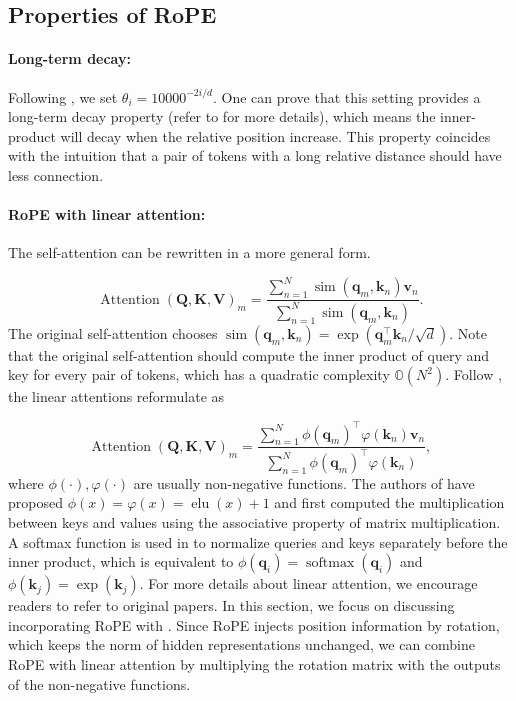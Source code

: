 \documentclass{article}
\def\q{{\boldsymbol q}}
\def\k{{\boldsymbol k}}
\def\v{{\boldsymbol v}}
\def\Q{{\boldsymbol Q}}
\def\K{{\boldsymbol K}}
\def\V{{\boldsymbol V}}
\begin{document}
\subsection{Properties of RoPE}
\label{sec: prop of RoPE}
\paragraph{Long-term decay:} 
Following \cite{Vaswani:2017}, we set $\theta_i=10000^{-2i/d}$. One can prove that this setting provides a long-term decay property (refer to  for more details), which means the inner-product will decay when the relative position increase. This property coincides with the intuition that a pair of tokens with a long relative distance should have less connection.

\paragraph{RoPE with linear attention:}
The self-attention can be rewritten in a more general form.

\begin{equation}
	\operatorname{Attention}(\mathbf{Q},\mathbf{K},\mathbf{V})_m=\frac{\sum_{n=1}^{N}\operatorname{sim}(\q_m,\k_n)\v_n}{\sum_{n=1}^{N}\operatorname{sim}(\q_m, \k_n)}.
	\label{fn:atten-full}
\end{equation}
The original self-attention chooses $\operatorname{sim}(\q_m,\k_n)=\exp(\q_m^{\intercal}\k_n/\sqrt{d})$. Note that the original self-attention should compute the inner product of query and key for every pair of tokens, which has a quadratic complexity $\mathbb{O}(N^2)$.  Follow \cite{katharopoulos2020transformers}, the linear attentions reformulate  as 

\begin{equation}
	\operatorname{Attention}(\Q,\K,\V)_m=\frac{\sum_{n=1}^{N}\phi(\q_m)^{\intercal}\varphi(\k_n)\v_n}{\sum_{n=1}^{N}\phi(\q_m)^{\intercal}\varphi(\k_n)},
	\label{fn:linear-attention}
\end{equation}
where $\phi(\cdot), \varphi(\cdot)$ are usually non-negative functions. The authors of \cite{katharopoulos2020transformers} have proposed $\phi(x)=\varphi(x)=\operatorname{elu}(x)+1$ and first computed the multiplication between keys and values using the associative property of matrix multiplication.  A softmax function is used in \cite{shen2021efficient} to normalize queries and keys separately before the inner product, which is equivalent to   $\phi(\q_i)=\operatorname{softmax}(\q_i)$ and $\phi(\k_j)=\exp(\k_j)$. For more details about linear attention, we encourage readers to refer to original papers. In this section, we focus on discussing incorporating RoPE with . Since RoPE injects position information by rotation, which keeps the norm of hidden representations unchanged, we can combine RoPE with linear attention by multiplying the rotation matrix with the outputs of the non-negative functions.
\end{document}
